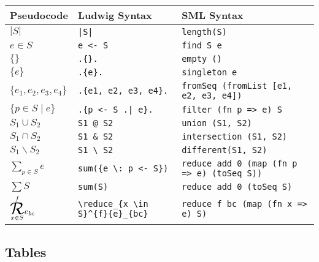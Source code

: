 \begin{tabular}{| l l l |}
\hline
\textbf{Pseudocode} & \textbf{Ludwig Syntax} & \textbf{SML Syntax}\\
\hline
$|S|$ & \verb"|S|" & \verb"length(S)"\\
$e \in S$ & \verb"e <- S" & \verb"find S e"\\
$\{\}$ & \verb".{}." & \verb"empty ()"\\
$\{e\}$ & \verb".{e}." & \verb"singleton e"\\
$\{e_1, e_2, e_3, e_4\}$ & \verb".{e1, e2, e3, e4}." & \verb"fromSeq (fromList [e1, e2, e3, e4])"\\
$\{p \in S \mid e\}$ & \verb".{p <- S .| e}." & \verb"filter (fn p => e) S"\\
$S_1 \cup S_2$ & \verb"S1 @ S2" & \verb"union (S1, S2)"\\
$S_1 \cap S_2$ & \verb"S1 & S2" & \verb"intersection (S1, S2)"\\
$S_1 \backslash S_2$ & \verb"S1 \ S2" & \verb"different(S1, S2)"\\
$\displaystyle \sum_{p \in S}{e}$ & \verb"sum({e \: p <- S})" & \verb"reduce add 0 (map (fn p => e) (toSeq S))"\\
$\displaystyle \sum{S}$ & \verb"sum(S)" & \verb"reduce add 0 (toSeq S)"\\
$\overset{f}{\underset{x \in S}{\reduce}}{e}_{bc}$ & \verb"\reduce_{x \in S}^{f}{e}_{bc}" & \verb"reduce f bc (map (fn x => e) S)"\\
\hline
\end{tabular}

\subsection{Tables}

